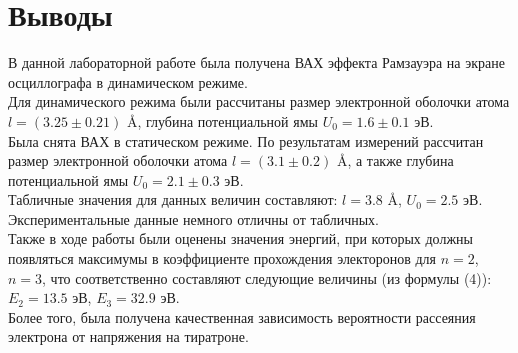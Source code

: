 \documentclass[a4paper,12pt]{article} %
\begin{document}
	\section*{Выводы}
	В данной лабораторной работе была получена ВАХ эффекта Рамзауэра на экране осциллографа в динамическом режиме. \\
	Для динамического режима были рассчитаны
	размер электронной оболочки атома $l = (3.25 \pm 0.21)$ \r{A}, глубина потенциальной ямы
	$U_0 = 1.6 \pm 0.1$ эВ.\\
	Была снята ВАХ в статическом режиме. По результатам измерений рассчитан
	размер электронной оболочки атома $l = (3.1 \pm 0.2)$ \r{A}, а также глубина потенциальной
	ямы $U_0 = 2.1 \pm 0.3$ эВ.\\
	Табличные значения для данных величин составляют: $l = 3.8$ \r{A}, $U_0 = 2.5$ эВ. Экспериментальные данные немного отличны от табличных.\\
	Также в ходе работы были оценены значения энергий, при которых должны
	появляться максимумы в коэффициенте прохождения электоронов для $n =2$, $n =3$,
	что соответственно составляют следующие величины (из формулы (4)): $E_2=13.5$ эВ, $E_3=32.9$ эВ.\\
	Более того, была получена качественная зависимость вероятности рассеяния электрона от напряжения на тиратроне.
\end{document}
